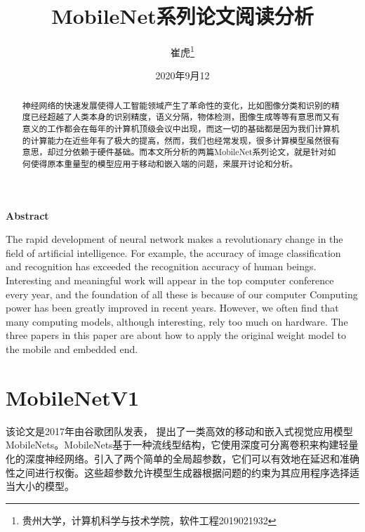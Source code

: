 \documentclass[UTF8,a4paper,12pt]{ctexart}
\title{\textbf{\Large{MobileNet系列论文阅读分析}}}
\author{ 崔虎\thanks{贵州大学，计算机科学与技术学院，软件工程2019021932} }
\date{2020年9月12}
\begin{document}
 
\maketitle
 
\begin{abstract}
{\kaishu 神经网络的快速发展使得人工智能领域产生了革命性的变化，比如图像分类和识别的精度已经超越了人类本身的识别精度，语义分隔，物体检测，图像生成等等有意思而又有意义的工作都会在每年的计算机顶级会议中出现，而这一切的基础都是因为我们计算机的计算能力在近些年有了极大的提高，然而，我们也经常发现，很多计算模型虽然很有意思，却过分依赖于硬件基础。而本文所分析的两篇MobileNet系列论文，就是针对如何使得原本重量型的模型应用于移动和嵌入端的问题，来展开讨论和分析。}
\end{abstract}
 
\begin{center}
\large{\textbf{Abstract}}
\end{center}
 
\begin{adjustwidth}{1cm}{1cm}
\hspace{1.5em}The rapid development of neural network makes a revolutionary change in the field of artificial intelligence. For example, the accuracy of image classification and recognition has exceeded the recognition accuracy of human beings. Interesting and meaningful work will appear in the top computer conference every year, and the foundation of all these is because of our computer Computing power has been greatly improved in recent years. However, we often find that many computing models, although interesting, rely too much on hardware. The three papers in this paper are about how to apply the original weight model to the mobile and embedded end.
\end{adjustwidth}
 
\thispagestyle{empty}       %
\newpage                    %
\newpage
\setcounter{page}{1}        %
 
 
\section{MobileNetV1}

	该论文是2017年由谷歌团队发表\cite{2017MobileNets}， 提出了一类高效的移动和嵌入式视觉应用模型MobileNets。MobileNets基于一种流线型结构，它使用深度可分离卷积来构建轻量化的深度神经网络。引入了两个简单的全局超参数，它们可以有效地在延迟和准确性之间进行权衡。这些超参数允许模型生成器根据问题的约束为其应用程序选择适当大小的模型。
	
\end{document}
